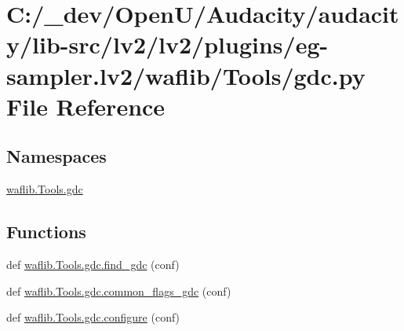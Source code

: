 \hypertarget{lv2_2plugins_2eg-sampler_8lv2_2waflib_2_tools_2gdc_8py}{}\section{C\+:/\+\_\+dev/\+Open\+U/\+Audacity/audacity/lib-\/src/lv2/lv2/plugins/eg-\/sampler.lv2/waflib/\+Tools/gdc.py File Reference}
\label{lv2_2plugins_2eg-sampler_8lv2_2waflib_2_tools_2gdc_8py}
\subsection*{Namespaces}
\begin{DoxyCompactItemize}
\item 
 \hyperlink{namespacewaflib_1_1_tools_1_1gdc}{waflib.\+Tools.\+gdc}
\end{DoxyCompactItemize}
\subsection*{Functions}
\begin{DoxyCompactItemize}
\item 
def \hyperlink{namespacewaflib_1_1_tools_1_1gdc_a1cd5f335a15d375707119a14d470eb68}{waflib.\+Tools.\+gdc.\+find\+\_\+gdc} (conf)
\item 
def \hyperlink{namespacewaflib_1_1_tools_1_1gdc_a559e20c4ab6c3d2f15571b2a6abcebff}{waflib.\+Tools.\+gdc.\+common\+\_\+flags\+\_\+gdc} (conf)
\item 
def \hyperlink{namespacewaflib_1_1_tools_1_1gdc_aa2ddc4f30ce9ee26ba9d494193c2efae}{waflib.\+Tools.\+gdc.\+configure} (conf)
\end{DoxyCompactItemize}
